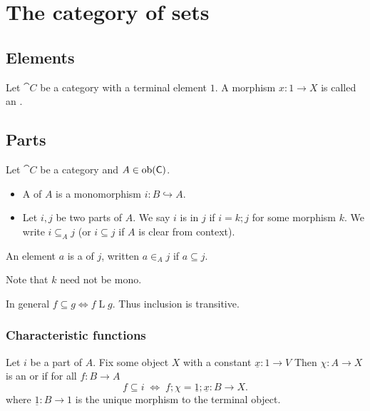 \section{The category of sets}
\subsection{Elements}
\begin{definition}
Let $\cat{C}$ be a category with a terminal element $1$. A morphism $x: 1\to X$ is called an .
\end{definition}

\subsection{Parts}
\begin{definition}
Let $\cat{C}$ be a category and $A\in\operatorname{ob}(\mathsf{C})$.
\begin{itemize}
\item A  of $A$ is a monomorphism $i: B \hookrightarrow A$.
\item Let $i,j$ be two parts of $A$. We say $i$ is  in $j$ if $i = k;j$ for some morphism $k$. We write $i\subseteq_A j$ (or $i\subseteq j$ if $A$ is clear from context).
\end{itemize}
An element $a$ is a  of $j$, written $a\in_A j$ if $a\subseteq j$.
\end{definition}
Note that $k$ need not be mono.

In general $f \subseteq g \iff f\mathrel{L}g$. Thus inclusion is transitive.

\subsubsection{Characteristic functions}
\begin{definition}
Let $i$ be a part of $A$. Fix some object $X$ with a constant $\underline{x}: 1\to V$ Then $\chi: A \to X$ is an  or  if for all $f: B\to A$
\[ f\subseteq i \;\iff\; f;\chi = \underline{1};\underline{x}: B\to X.  \]
where $\underline{1}: B\to 1$ is the unique morphism to the terminal object.
\end{definition}

